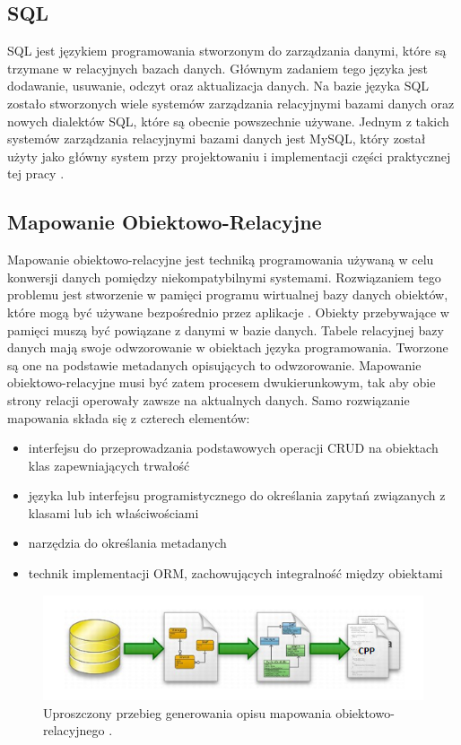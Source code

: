 \documentclass[12pt]{report}
\begin{document}
\subsection{SQL}
	\indent SQL jest językiem programowania stworzonym do zarządzania danymi, które są trzymane w relacyjnych bazach danych. Głównym zadaniem tego języka jest dodawanie, usuwanie, odczyt oraz aktualizacja danych. Na bazie języka SQL zostało stworzonych wiele systemów zarządzania relacyjnymi bazami danych oraz nowych dialektów SQL, które są obecnie powszechnie używane. Jednym z takich systemów zarządzania relacyjnymi bazami danych jest MySQL, który został użyty jako główny system przy projektowaniu i implementacji części praktycznej tej pracy \cite{sql}.
\subsection{Mapowanie Obiektowo-Relacyjne}
	\indent Mapowanie obiektowo-relacyjne jest techniką programowania używaną w celu konwersji danych pomiędzy niekompatybilnymi systemami. Rozwiązaniem tego problemu jest stworzenie w pamięci programu wirtualnej bazy danych obiektów, które mogą być używane bezpośrednio przez aplikacje \cite{hibernateInAction}. Obiekty przebywające w pamięci muszą być powiązane z danymi w bazie danych. Tabele relacyjnej bazy danych mają swoje odwzorowanie w obiektach języka programowania. Tworzone są one na podstawie metadanych opisujących to odwzorowanie. Mapowanie obiektowo-relacyjne musi być zatem procesem dwukierunkowym, tak aby obie strony relacji operowały zawsze na aktualnych danych. Samo rozwiązanie mapowania składa się z czterech elementów:
	\begin{itemize}
	\item{interfejsu do przeprowadzania podstawowych operacji CRUD na obiektach klas zapewniających trwałość}
	\item{języka lub interfejsu programistycznego do określania zapytań związanych z klasami lub ich właściwościami}
	\item{narzędzia do określania metadanych}
	\item{technik implementacji ORM, zachowujących integralność między obiektami}
	\end{itemize}

	\begin{figure}[!ht]
		\centering
		\includegraphics[width=1\textwidth]{images/orm.png}
		\caption{Uproszczony przebieg generowania opisu mapowania obiektowo-relacyjnego \cite{ormimg}.}
	\end{figure}
\end{document}
